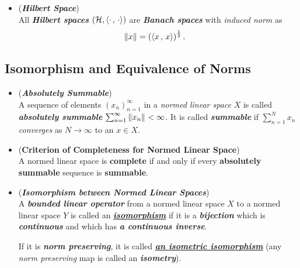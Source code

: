 \documentclass[11pt]{article}
\begin{document}
\begin{itemize}
\item \begin{example} (\emph{\textbf{Hilbert Space}})\\
All \emph{\textbf{Hilbert spaces}} $({\mathcal H}, \left\langle \cdot\,,\, \cdot \right\rangle)$ are \textbf{\emph{Banach spaces}} with \emph{induced norm} as
\begin{align*}
\left\|x\right\|_{} &= \left(\left\langle x\,,\, x \right\rangle\right)^{\frac{1}{2}}.
\end{align*} 
\end{example}
\end{itemize}

\subsection{Isomorphism and Equivalence of Norms}
\begin{itemize}
\item \begin{definition} (\emph{\textbf{Absolutely Summable}})\\
A sequence of elements $(x_n)_{n=1}^{\infty}$ in a \emph{normed linear space} $X$ is called \emph{\textbf{absolutely summable}} $\sum_{n=1}^{\infty}\left\|x_n\right\|_{} < \infty$. It is called \emph{\textbf{summable}} if $\sum_{n=1}^{N}x_n$ \emph{converges} as $N \rightarrow\infty$ to an $x \in X$.
\end{definition}

\item \begin{proposition} (\textbf{Criterion of Completeness for Normed Linear Space}) \citep{reed1980methods} \\
A normed linear space is \textbf{complete} if and only if every \textbf{absolutely summable} sequence is \textbf{summable}.
\end{proposition}

\item \begin{definition} (\emph{\textbf{Isomorphism between Normed Linear Spaces}})\\
A \textit{\textbf{bounded linear operator}} from a normed linear space $X$ to a normed linear space $Y$ is called an \underline{\emph{\textbf{isomorphism}}} if it is a \emph{\textbf{bijection}} which is \emph{\textbf{continuous}} and which has \emph{\textbf{a continuous inverse}}. 

If it is \emph{\textbf{norm preserving}}, it is called \underline{\emph{\textbf{an isometric isomorphism}}} (any \emph{norm preserving} map is called an \emph{\textbf{isometry}}).
\end{definition}



\end{itemize}
\end{document}
